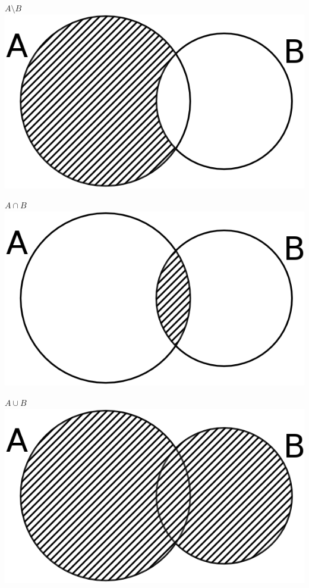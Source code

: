 \documentclass[a4paper,12pt]{article} %
\begin{document}
\begin{minipage}{0,33\textwidth}
	\centering 
	$A \setminus B$
	\includegraphics{images/pic1.png}
\end{minipage}
\begin{minipage}{0,33\textwidth}
	\centering
	$A \cap B$
	\includegraphics{images/pic2.png}
\end{minipage}
\begin{minipage}{0,33\textwidth}
	\centering
	$A \cup B$
	\includegraphics{images/pic3.png}
\end{minipage}
\end{document}
